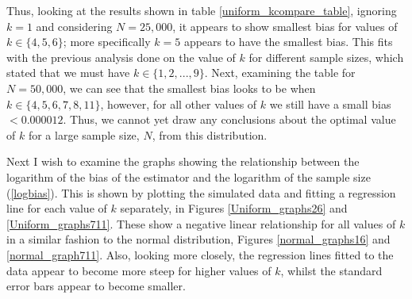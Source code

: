 \documentclass[12pt]{report}
\begin{document}
Thus, looking at the results shown in table \ref{uniform_kcompare_table}, ignoring $k=1$ and considering $N=25,000$, it appears to show smallest bias for values of $k \in \{4, 5, 6 \}$; more specifically $k=5$ appears to have the smallest bias. This fits with the previous analysis done on the value of $k$ for different sample sizes, which stated that we must have $k \in \{1, 2, ..., 9\}$. Next, examining the table for $N=50,000$, we can see that the smallest bias looks to be when $k \in \{ 4, 5, 6, 7, 8, 11\}$, however, for all other values of $k$ we still have a small bias $< 0.000012$. Thus, we cannot yet draw any conclusions about the optimal value of $k$ for a large sample size, $N$, from this distribution.

Next I wish to examine the graphs showing the relationship between the logarithm of the bias of the estimator and the logarithm of the sample size (\ref{logbias}). This is shown by plotting the simulated data and fitting a regression line for each value of $k$ separately, in Figures \ref{Uniform_graphs26} and \ref{Uniform_graphs711}. These show a negative linear relationship for all values of $k$ in a similar fashion to the normal distribution, Figures \ref{normal_graphs16} and \ref{normal_graph711}. Also, looking more closely, the regression lines fitted to the data appear to become more steep for higher values of $k$, whilst the standard error bars appear to become smaller. 
\end{document}
